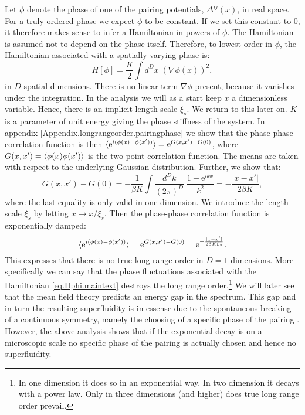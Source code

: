 Let $\phi$ denote the phase of one of the pairing potentials, $\Delta^{ij}(x)$, in real space. For a truly ordered phase we expect $\phi$ to be constant. If we set this constant to 0, it therefore makes sense to infer a Hamiltonian in powers of $\phi$. The Hamiltonian is assumed not to depend on the phase itself. Therefore, to lowest order in $\phi$, the Hamiltonian associated with a spatially varying phase is: 
\begin{equation}
H[\phi] = \frac{K}{2}\int d^{D}x \; \left(\nabla \phi(x)\right)^2, 
\label{eq.Hphi.maintext}
\end{equation}
in $D$ spatial dimensions. There is no linear term $\nabla \phi$ present, because it vanishes under the integration. In the analysis we will as a start keep $x$ a dimensionless variable. Hence, there is an implicit length scale $\xi_s$. We return to this later on. $K$ is a parameter of unit energy giving the phase stiffness of the system. In appendix \ref{Appendix.longrangeorder.pairingphase} we show that the phase-phase correlation function is then $\braket{ \text{e}^{i(\phi(x)- \phi(x'))} } = \text{e}^{G(x,x') - G(0)}$, where $G(x,x') = \braket{\phi(x)\phi(x')}$ is the two-point correlation function. The means are taken with respect to the underlying Gaussian distribution. Further, we show that:
\begin{equation}
G(x,x') - G(0) = -\frac{1}{\beta K}\int \frac{d^{D}k}{(2\pi)^D}\; \frac{1 - \text{e}^{ikx}}{k^2} = -\frac{|x - x'|}{2\beta K}, \nonumber 
\end{equation}
where the last equality is only valid in one dimension. We introduce the length scale $\xi_s$ by letting $x \to x / \xi_s$. Then the phase-phase correlation function is exponentially damped: 
\begin{equation}
\braket{ \text{e}^{i(\phi(x)- \phi(x'))} } = \text{e}^{G(x,x') - G(0)} = \text{e}^{-\frac{|x - x'|}{2\beta K \xi_s}}. 
\label{eq.phasecorrelationfunction.onedimension.maintext} 
\end{equation}
This expresses that there is no true long range order in $D = 1$ dimensions. More specifically we can say that the phase fluctuations associated with the Hamiltonian \eqref{eq.Hphi.maintext} destroys the long range order.\footnote{In one dimension it does so in an exponential way. In two dimension it decays with a power law. Only in three dimensions (and higher) does true long range order prevail.} We will later see that the mean field theory predicts an energy gap in the spectrum. This gap and in turn the resulting superfluidity is in essense due to the spontaneous breaking of a continuous symmetry, namely the choosing of a specific phase of the pairing \cite[pp. 341-346]{BruusFlensberg}. However, the above analysis shows that if the exponential decay is on a microscopic scale no specific phase of the pairing is actually chosen and hence no superfluidity. 

